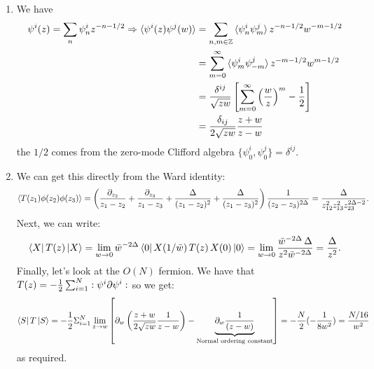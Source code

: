 \documentclass[11pt]{article}
\begin{document}
\begin{enumerate}
	We see that the $G/H$ theory has central charge:
	\[
		c_G - c_H = \left(\frac{m \times 3}{m+2} + \frac{1 \times 3}{1+2} \right) - \frac{(m+1) \times 3}{m+1 + 2} = 1 + \frac{3m}{m+2} - \frac{3(m+1)}{m+3} = 1 - \frac{6}{(m+2)(m+3)}
	\]
	exactly coincident with the prescribed formula for the minimal models. So, we expect at $m=1$ to get the Ising CFT.  
	
	\item We have 
	\[
	\begin{aligned}
				\psi^i (z) = \sum_n \psi_n^i z^{-n-1/2} \Rightarrow \braket{\psi^i(z) \psi^j(w)} &= \sum_{n,m \in \mathbb Z} \braket{\psi_n^i \psi_m^j} z^{-n-1/2} w^{-m-1/2}\\ &= \sum_{m=0}^\infty \braket{\psi_{m}^i  \psi_{-m}^j} z^{-m-1/2} w^{m-1/2}\\ &= \frac{\delta^{ij}}{\sqrt{z w}} \left[ \sum_{m=0}^\infty \left(\frac{w}{z}\right)^m - \frac12 \right]\\ &= \frac{\delta_{ij}}{2 \sqrt{z w}} \frac{z+w}{z-w}
	\end{aligned}
	\]
	the $1/2$ comes from the zero-mode Clifford algebra $\{ \psi^i_0 , \psi^j_0\} = \delta^{ij}$.
	\item We can get this directly from the Ward identity:
	\[
		\braket{T(z_1) \phi(z_2) \phi(z_3)}  = \left(\frac{\partial_{z_2}}{z_1 - z_2} + \frac{\partial_{z_3}}{z_1 - z_3} + \frac{\Delta}{(z_1-z_2)^2} + \frac{\Delta}{(z_1-z_3)^2} \right) \frac{1}{(z_2 - z_3)^{2 \Delta}} = \frac{\Delta}{z_{12}^2 z_{13}^2 z_{23}^{2\Delta - 2}}.
	\]
	Next, we can write:
	\[
		\bra{X} T(z) \ket{X} = \lim_{w \to 0} \bar w^{-2\Delta} \bra{0} X(1/\bar w) \, T(z) \, X(0) \ket{0} = \lim_{w\to 0}  \frac{ \bar w^{-2 \Delta}\, \Delta}{z^2 \bar w^{-2 \Delta}} = \frac{\Delta}{z^2}.
	\]
	Finally, let's look at the $O(N)$ fermion. We have that $T(z) = -\frac12 \sum_{i=1}^N :\psi^i \partial \psi^i:$ so we get:
	\[
		\bra{S} T \ket{S} = - \frac12 \Sigma_{i=1}^N \lim_{z \to w} \left[\partial_w\left( \frac{z+w}{2 \sqrt{z w}} \frac{1}{z-w} \right) - \underbrace{\partial_w \frac{1}{(z-w)}}_{\text{Normal ordering constant}} \right] = -\frac{N}{2} (-\frac{1}{8 w^2}) = \frac{N/16}{w^2}
	\]
	as required. 
	

\end{enumerate}
\end{document}

